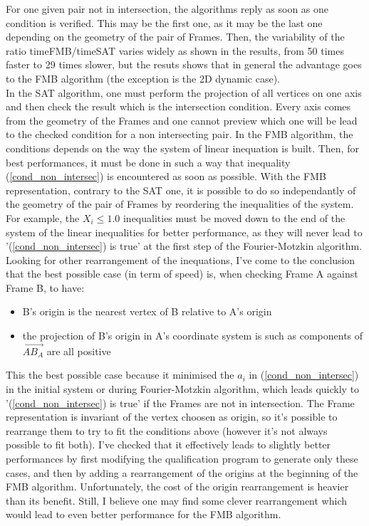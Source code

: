 \documentclass[12pt, a4paper]{article}
\begin{document}
For one given pair not in intersection, the algorithms reply as soon as one condition is verified. This may be the first one, as it may be the last one depending on the geometry of the pair of Frames. Then, the variability of the ratio timeFMB/timeSAT varies widely as shown in the results, from 50 times faster to 29 times slower, but the resuts shows that in general the advantage goes to the FMB algorithm (the exception is the 2D dynamic case).\\

In the SAT algorithm, one must perform the projection of all vertices on one axis and then check the result which is the intersection condition. Every axis comes from the geometry of the Frames and one cannot preview which one will be lead to the checked condition for a non intersecting pair. In the FMB algorithm, the conditions depends on the way the system of linear inequation is built. Then, for best performances, it must be done in such a way that inequality (\ref{cond_non_intersec}) is encountered as soon as possible. With the FMB representation, contrary to the SAT one, it is possible to do so independantly of the geometry of the pair of Frames by reordering the inequalities of the system. For example, the $X_i\le1.0$ inequalities must be moved down to the end of the system of the linear inequalities for better performance, as they will never lead to '(\ref{cond_non_intersec}) is true' at the first step of the Fourier-Motzkin algorithm.\\

Looking for other rearrangement of the inequations, I've come to the conclusion that the best possible case (in term of speed) is, when checking Frame A against Frame B, to have:\\
\begin{itemize}
\item B's origin is the nearest vertex of B relative to A's origin
\item the projection of B's origin in A's coordinate system is such as components of $\overrightarrow{AB_A}$ are all positive
\end{itemize}
This the best possible case because it minimised the $a_i$ in (\ref{cond_non_intersec}) in the initial system or during Fourier-Motzkin algorithm, which leads quickly to '(\ref{cond_non_intersec}) is true' if the Frames are not in intersection. The Frame representation is invariant of the vertex choosen as origin, so it's possible to rearrange them to try to fit the conditions above (however it's not always possible to fit both). I've checked that it effectively leads to slightly better performances by first modifying the qualification program to generate only these cases, and then by adding a rearrangement of the origins at the beginning of the FMB algorithm. Unfortunately, the cost of the origin rearrangement is heavier than its benefit. Still, I believe one may find some clever rearrangement which would lead to even better performance for the FMB algorithm.\\
\end{document}
